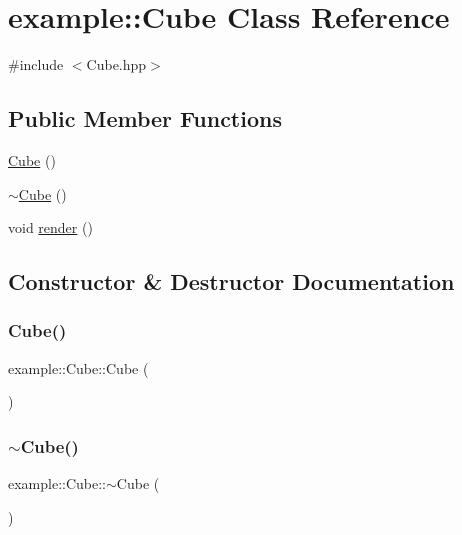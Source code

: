 \hypertarget{classexample_1_1_cube}{}\section{example\+:\+:Cube Class Reference}
\label{classexample_1_1_cube}


{\ttfamily \#include $<$Cube.\+hpp$>$}

\subsection*{Public Member Functions}
\begin{DoxyCompactItemize}
\item 
\mbox{\hyperlink{classexample_1_1_cube_a3be7fbbad6d33b8ca68487fea7e20bdf}{Cube}} ()
\item 
\mbox{\hyperlink{classexample_1_1_cube_ab82f621c8aeb1ce7ccd72afd605d6b7a}{$\sim$\+Cube}} ()
\item 
void \mbox{\hyperlink{classexample_1_1_cube_a9f968872ab6a7ee0362e49a0c5f4e8b6}{render}} ()
\end{DoxyCompactItemize}


\subsection{Constructor \& Destructor Documentation}
\mbox{\label{classexample_1_1_cube_a3be7fbbad6d33b8ca68487fea7e20bdf}} 
\subsubsection{\texorpdfstring{Cube()}{Cube()}}
{\footnotesize\ttfamily example\+::\+Cube\+::\+Cube (\begin{DoxyParamCaption}{ }\end{DoxyParamCaption})}

\mbox{\label{classexample_1_1_cube_ab82f621c8aeb1ce7ccd72afd605d6b7a}} 
\subsubsection{\texorpdfstring{$\sim$\+Cube()}{~Cube()}}
{\footnotesize\ttfamily example\+::\+Cube\+::$\sim$\+Cube (\begin{DoxyParamCaption}{ }\end{DoxyParamCaption})}



